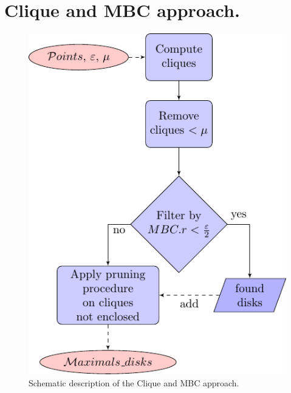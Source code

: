 \clearpage
\section{Clique and MBC approach.}\label{app:cmbc_flowchar}
\renewcommand{\thefigure}{C.1}
\begin{figure}[h!]
    \centering
    \includegraphics[width=0.65\linewidth]{chapterPFlocks/figures/plots/10_cmbc_variants/CMBC_flowchart2.pdf}
    \caption{Schematic description of the Clique and MBC approach.}
\end{figure}

